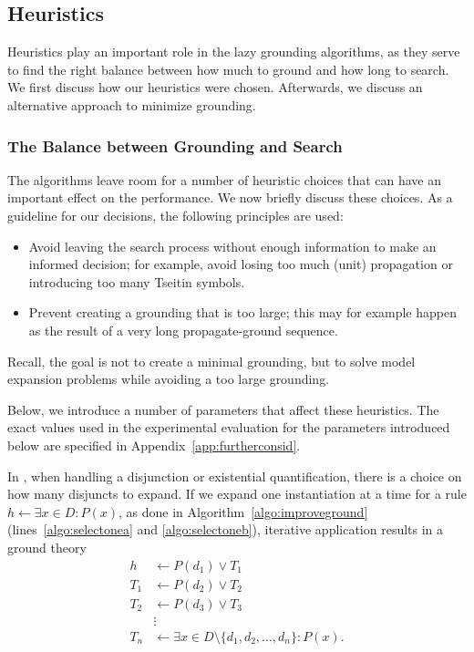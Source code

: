 \documentclass[11pt]{article}
\newcommand{\m}[1]{\ensuremath{#1}\xspace}
\newcommand{\lrule}{\m{\leftarrow}}
\newcommand{\typed}[2]{\m{#1\in #2:}}
\theoremstyle{plain}
\theoremstyle{definition}
\theoremstyle{example_basic}
\theoremstyle{example_contd}
\theoremstyle{plain}
\newcommand{\change}[1]{#1}
\begin{document}
\subsection{Heuristics}\label{ssec:heur}
Heuristics play an important role in the lazy grounding algorithms, as they serve to find the right balance between how much to ground and how long to search. We first discuss how our heuristics were chosen. Afterwards, we discuss an alternative approach to minimize  grounding.

\subsubsection{The Balance between Grounding and Search}
The algorithms leave room for a number of heuristic choices that can have an important effect on the performance. We now briefly discuss these choices. As a guideline for our decisions, the following principles are used:
\begin{itemize}
  \item Avoid leaving the search process without enough information to make an informed decision; for example, avoid losing too much (unit) propagation or introducing too many Tseitin symbols.
  \item Prevent creating a grounding that is too large; this may for example happen as the result of a very long propagate-ground sequence.
\end{itemize}
Recall, the goal is not to create a minimal grounding, but to solve model expansion problems while avoiding a too large grounding.

\change{Below, we introduce a number of parameters that affect these heuristics. The exact values used in the experimental evaluation for the parameters introduced below are specified in Appendix~\ref{app:furtherconsid}. } 

In \splitandground, when handling a disjunction or existential quantification, there is a choice on how many disjuncts to expand. If we expand one instantiation at a time for a rule $h\lrule \exists \typed{x}{D} P(x)$, as done in Algorithm~\ref{algo:improveground} (lines~\ref{algo:selectonea} and \ref{algo:selectoneb}), iterative application results in a ground theory 
\begin{align*}
h&\lrule P(d_1) \lor T_1 \\
T_1 &\lrule P(d_2) \lor T_2 \\
T_2& \lrule P(d_3) \lor T_3\\
& \vdots\\
T_n &\lrule \exists\typed{x}{D \setminus \{d_1, d_2, \ldots, d_n\}} P(x).
\end{align*}
\end{document}
